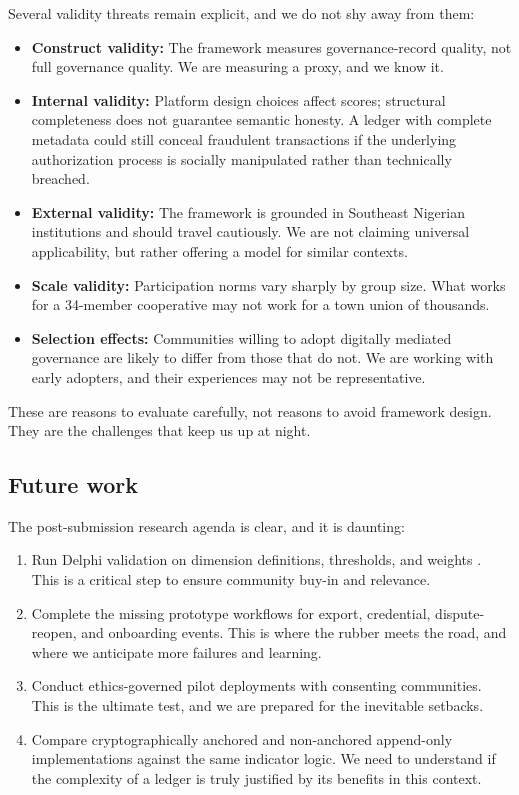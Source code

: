 \documentclass[sigconf]{acmart}
\begin{document}
Several validity threats remain explicit, and we do not shy away from them:

\begin{itemize}
\item \textbf{Construct validity:} The framework measures governance-record quality, not full governance quality. We are measuring a proxy, and we know it.
\item \textbf{Internal validity:} Platform design choices affect scores; structural completeness does not guarantee semantic honesty. A ledger with complete metadata could still conceal fraudulent transactions if the underlying authorization process is socially manipulated rather than technically breached.
\item \textbf{External validity:} The framework is grounded in Southeast Nigerian institutions and should travel cautiously. We are not claiming universal applicability, but rather offering a model for similar contexts.
\item \textbf{Scale validity:} Participation norms vary sharply by group size. What works for a 34-member cooperative may not work for a town union of thousands.
\item \textbf{Selection effects:} Communities willing to adopt digitally mediated governance are likely to differ from those that do not. We are working with early adopters, and their experiences may not be representative.
\end{itemize}

These are reasons to evaluate carefully, not reasons to avoid framework design. They are the challenges that keep us up at night.

\subsection{Future work}

The post-submission research agenda is clear, and it is daunting:

\begin{enumerate}
\item Run Delphi validation on dimension definitions, thresholds, and weights \cite{rowe1999}. This is a critical step to ensure community buy-in and relevance.
\item Complete the missing prototype workflows for export, credential, dispute-reopen, and onboarding events. This is where the rubber meets the road, and where we anticipate more failures and learning.
\item Conduct ethics-governed pilot deployments with consenting communities. This is the ultimate test, and we are prepared for the inevitable setbacks.
\item Compare cryptographically anchored and non-anchored append-only implementations against the same indicator logic. We need to understand if the complexity of a ledger is truly justified by its benefits in this context.
\end{enumerate}
\end{document}
